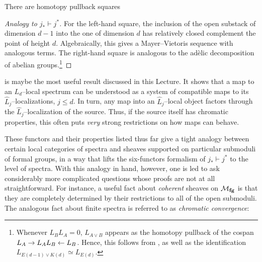 \begin{corollary}\label{ChromaticFractureSquares}
There are homotopy pullback squares
\begin{center}
\end{center}
\end{corollary}
\begin{proof}[Analogy to \(j_* \vdash j^*\)]
For the left-hand square, the inclusion of the open substack of dimension \(d-1\) into the one of dimension \(d\) has relatively closed complement the point of height \(d\).  Algebraically, this gives a Mayer--Vietoris sequence with analogous terms.  The right-hand square is analogous to the ad\`elic decomposition of abelian groups.\footnote{Whenever \(L_B L_A = 0\), \(L_{A \vee B}\) appears as the homotopy pullback of the cospan \(L_A \to L_A L_B \leftarrow L_B\).  Hence, this follows from , as well as the identification \(L_{E(d-1) \vee K(d)} \simeq L_{E(d)}\).}
\end{proof}

\begin{remark}
 is maybe the most useful result discussed in this Lecture.  It shows that a map to an \(L_d\)--local spectrum can be understood as a system of compatible maps to its \(\widehat L_j\)--localizations, \(j \le d\).  In turn, any map into an \(\widehat L_j\)--local object factors through the \(\widehat L_j\)--localization of the source.  Thus, if the source itself has chromatic properties, this often puts \emph{very} strong restrictions on how maps can behave.
\end{remark}

These functors and their properties listed thus far give a tight analogy between certain local categories of spectra and sheaves supported on particular submoduli of formal groups, in a way that lifts the six-functors formalism of \(j_* \vdash j^*\) to the level of spectra.  With this analogy in hand, however, one is led to ask considerably more complicated questions whose proofs are not at all straightforward.  For instance, a useful fact about \emph{coherent} sheaves on \(\mathcal{M}_{\mathbf{fg}}\) is that they are completely determined by their restrictions to all of the open submoduli.  The analogous fact about finite spectra is referred to as \textit{chromatic convergence}:

